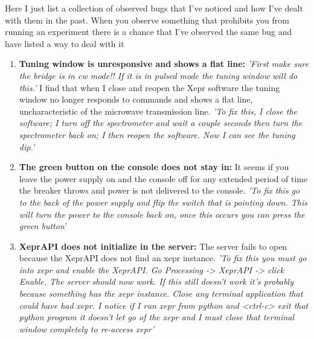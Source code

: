 \documentclass{article}
\newcommand{\fc}[1]{{\color{blue}\textit{'{#1}'}}}
\begin{document}
Here I just list a collection of observed bugs that I've noticed and how I've dealt with them in the past. When you observe something that prohibits you from running an experiment there is a chance that I've observed the same bug and have listed a way to deal with it 


\begin{enumerate}
    \item {\bf Tuning window is unresponsive and shows a flat line:} \fc{First make sure the bridge is in cw mode!! If it is in pulsed mode the tuning window will do this.} I find that when I close and reopen the Xepr software the tuning window no longer responds to commands and shows a flat line, uncharacteristic of the microwave transmission line. \fc{To fix this, I close the software; I turn off the spectrometer and wait a couple seconds then turn the spectrometer back on; I then reopen the software. Now I can see the tuning dip.}

\item {\bf The green button on the console does not stay in:} It seems if you leave the power supply on and the console off for any extended period of time the breaker throws and power is not delivered to the console. \fc{To fix this go to the back of the power supply and flip the switch that is pointing down. This will turn the power to the console back on, once this occurs you can press the green button}

\item {\bf XeprAPI does not initialize in the server:} The server fails to open because the XeprAPI does not find an xepr instance. \fc{To fix this you must go into xepr and enable the XeprAPI. Go Processing -> XeprAPI -> click Enable. The server should now work. If this still doesn't work it's probably because something has the xepr instance. Close any terminal application that could have had xepr. I notice if I run xepr from python and <ctrl-c> exit that python program it doesn't let go of the xepr and I must close that terminal window completely to re-access xepr}

\end{enumerate}

{}

\end{document}
